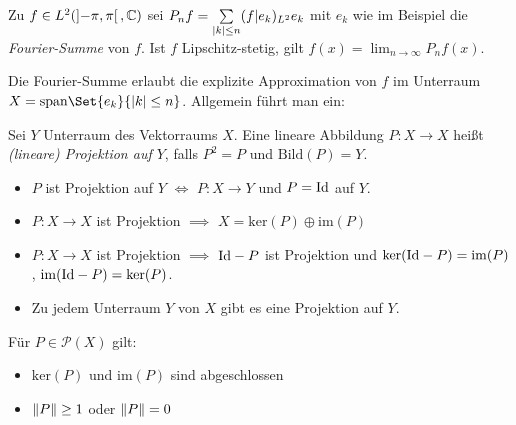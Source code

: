 \documentclass{cheat-sheet}
\begin{document}

\begin{lem}
  Zu $f \in L^2(\left] -\pi, \pi \right[, \mathbb{C})$ sei $P_n f = \sum_{\abs{k} \leq n} (f | e_k)_{L^2} e_k$ mit $e_k$ wie im Beispiel die \emph{Fourier-Summe} von $f$. Ist $f$ Lipschitz-stetig, gilt $f(x) = \lim_{n \to \infty} P_n f(x)$.
\end{lem}


Die Fourier-Summe erlaubt die explizite Approximation von $f$ im Unterraum $X = \mathrm{span} \Set{e_k}{ \abs{k} \leq n }$. Allgemein führt man ein:

\begin{defn}
  Sei $Y$ Unterraum des Vektorraums $X$. Eine lineare Abbildung $P : X \to X$ heißt \emph{(lineare) Projektion auf $Y$}, falls $P^2 = P$ und $\mathrm{Bild}(P) = Y$.
\end{defn}

\begin{lem}
  \begin{itemize}
    \item $P$ ist Projektion auf $Y$ $\iff$ $P : X \to Y$ und $P = \mathrm{Id}$ auf $Y$.
    \item $P : X \to X$ ist Projektion $\implies$ $X = \mathrm{ker}(P) \oplus \mathrm{im}(P)$
    \item $P : X \to X$ ist Projektion $\implies$ $\mathrm{Id} - P$ ist Projektion und $\ker(\mathrm{Id} - P) = \mathrm{im}(P)$, $\mathrm{im}(\mathrm{Id} - P) = \mathrm{ker}(P)$.
    \item Zu jedem Unterraum $Y$ von $X$ gibt es eine Projektion auf $Y$.
  \end{itemize}
\end{lem}



\begin{lem}
  Für $P \in \mathcal{P}(X)$ gilt:
  \begin{itemize}
    \item $\mathrm{ker}(P)$ und $\mathrm{im}(P)$ sind abgeschlossen
    \item $\lVert P\rVert \geq 1$ oder $\lVert P\rVert = 0$
  \end{itemize}
\end{lem}
\end{document}
